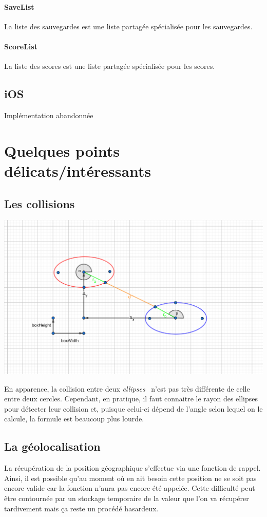 \documentclass{article}
\begin{document}
\paragraph{SaveList}
La liste des sauvegardes est une liste partagée spécialisée pour les sauvegardes.

\paragraph{ScoreList}
La liste des scores est une liste partagée spécialisée pour les scores.


\subsection{iOS}
Implémentation abandonnée



\section{Quelques points délicats/intéressants}

\subsection{Les collisions}
\begin{center}
\includegraphics[scale=0.25]{Collision.png}
\end{center}
En apparence, la collision entre deux \textit{ellipses}~\cite{ellipseDoc} n'est pas très différente de celle entre deux cercles. Cependant, en pratique, il faut connaitre le rayon des ellipses pour détecter leur collision et, puisque celui-ci dépend de l'angle selon lequel on le calcule, la formule est beaucoup plus lourde.

\subsection{La géolocalisation}
La récupération de la position géographique s’effectue via une fonction de rappel. Ainsi, il est possible qu'au moment où en ait besoin cette position ne se soit pas encore valide car la fonction n'aura pas encore été appelée. Cette difficulté peut être contournée par un stockage temporaire de la valeur que l'on va récupérer tardivement mais ça reste un procédé hasardeux.
\end{document}
